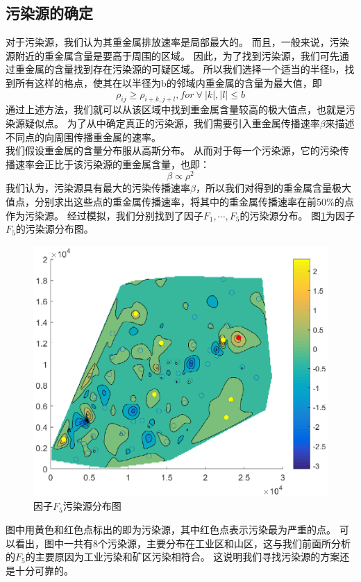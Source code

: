 \documentclass[a4paper]{article}
\begin{document}
\subsection{污染源的确定}
对于污染源，我们认为其重金属排放速率是局部最大的。
而且，一般来说，污染源附近的重金属含量是要高于周围的区域。
因此，为了找到污染源，我们可先通过重金属的含量找到存在污染源的可疑区域。
所以我们选择一个适当的半径b，找到所有这样的格点，使其在以半径为b的邻域内重金属的含量为最大值，即
\begin{equation}
\rho_{ij} \geq \rho_{i+k, j+l}, for\ \forall \ |k|, |l| \le b
\end{equation}
通过上述方法，我们就可以从该区域中找到重金属含量较高的极大值点，也就是污染源疑似点。
为了从中确定真正的污染源，我们需要引入重金属传播速率$\beta$来描述不同点的向周围传播重金属的速率。\\
\indent 我们假设重金属的含量分布服从高斯分布。
从而对于每一个污染源，它的污染传播速率会正比于该污染源的重金属含量，也即：
\begin{equation}
\beta \propto \rho^2
\end{equation}
我们认为，污染源具有最大的污染传播速率$\beta$，所以我们对得到的重金属含量极大值点，分别求出这些点的重金属传播速率，将其中的重金属传播速率在前50\%的点作为污染源。
经过模拟，我们分别找到了因子$F_1,\cdots,F_5$的污染源分布。
图\ref{fig:polluted-source}为因子$F_5$的污染源分布图。
\begin{figure}
    \centering 
    \includegraphics[scale=0.9]{pictures/polluted-source.eps}
    \caption{因子$F_5$污染源分布图}
    \label{fig:polluted-source}
\end{figure}
图中用黄色和红色点标出的即为污染源，其中红色点表示污染最为严重的点。
可以看出，图中一共有8个污染源，主要分布在工业区和山区，这与我们前面所分析的$F_5$的主要原因为工业污染和矿区污染相符合。
这说明我们寻找污染源的方案还是十分可靠的。
\end{document}
